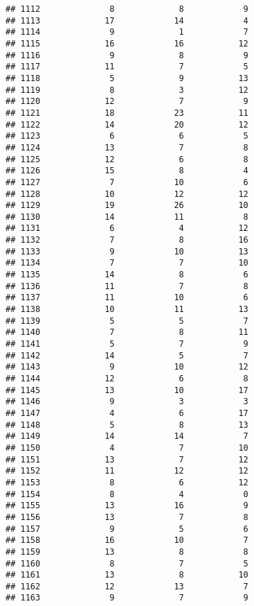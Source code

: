 \documentclass[
]{article}
\begin{document}
\begin{verbatim}
## 1112              8             8            9
## 1113             17            14            4
## 1114              9             1            7
## 1115             16            16           12
## 1116              9             8            9
## 1117             11             7            5
## 1118              5             9           13
## 1119              8             3           12
## 1120             12             7            9
## 1121             18            23           11
## 1122             14            20           12
## 1123              6             6            5
## 1124             13             7            8
## 1125             12             6            8
## 1126             15             8            4
## 1127              7            10            6
## 1128             10            12           12
## 1129             19            26           10
## 1130             14            11            8
## 1131              6             4           12
## 1132              7             8           16
## 1133              9            10           13
## 1134              7             7           10
## 1135             14             8            6
## 1136             11             7            8
## 1137             11            10            6
## 1138             10            11           13
## 1139              5             5            7
## 1140              7             8           11
## 1141              5             7            9
## 1142             14             5            7
## 1143              9            10           12
## 1144             12             6            8
## 1145             13            10           17
## 1146              9             3            3
## 1147              4             6           17
## 1148              5             8           13
## 1149             14            14            7
## 1150              4             7           10
## 1151             13             7           12
## 1152             11            12           12
## 1153              8             6           12
## 1154              8             4            0
## 1155             13            16            9
## 1156             13             7            8
## 1157              9             5            6
## 1158             16            10            7
## 1159             13             8            8
## 1160              8             7            5
## 1161             13             8           10
## 1162             12            13            7
## 1163              9             7            9

\end{verbatim}
\end{document}
